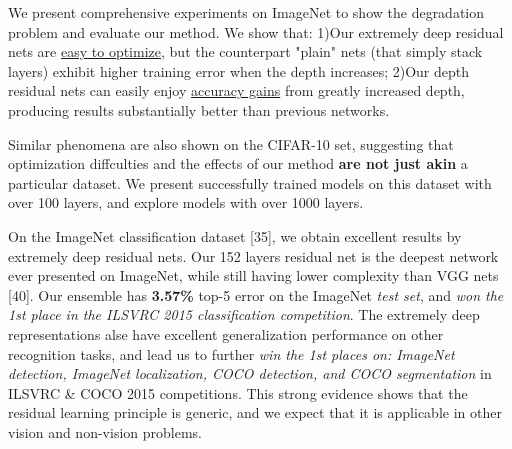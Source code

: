 We present comprehensive experiments on ImageNet to show the degradation problem and evaluate our method. We show that: 1)Our extremely deep residual nets are \underline{easy to optimize}, but the counterpart "plain" nets (that simply stack layers) exhibit higher training error when the depth increases; 2)Our depth residual nets can easily enjoy \underline{accuracy gains} from greatly increased depth, producing results substantially better than previous networks.

Similar phenomena are also shown on the CIFAR-10 set, suggesting that optimization diffculties and the effects of our method \textbf{are not just akin} a particular dataset. We present successfully trained models on this dataset with over 100 layers, and explore models with over 1000 layers.

On the ImageNet classification dataset [35], we obtain excellent results by extremely deep residual nets. Our 152 layers residual net is the deepest network ever presented on ImageNet, while still having lower complexity than VGG nets [40]. Our ensemble has \textbf{3.57\%} top-5 error on the ImageNet \textit{test set}, and \emph{won the 1st place in the ILSVRC 2015 classification competition}.  The extremely deep representations alse have excellent generalization performance on other recognition tasks, and lead us to further \emph{win the 1st places on: ImageNet detection, ImageNet localization, COCO detection, and COCO segmentation} in ILSVRC \& COCO 2015 competitions. This strong evidence shows that the residual learning principle is generic, and we expect that it is applicable in other vision and non-vision problems.


